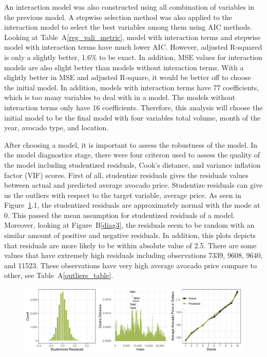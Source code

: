 \documentclass[11pt]{article}\usepackage[]{graphicx}\usepackage[]{color}
\makeatletter
\def\maxwidth{ %
  \ifdim\Gin@nat@width>\linewidth
    \linewidth
  \else
    \Gin@nat@width
  \fi
}
\makeatother
\begin{document}
\noindent An interaction model was also constructed using all combination of variables in the previous model. A stepwise selection method was also applied to the interaction model to select the best variables among them using AIC methods. Looking at Table~A\ref{reg_vali_metric}, model with interaction terms and stepwise model with interaction terms have much lower AIC. However, adjusted R-squared is only a slightly better, 1.6\% to be exact. In addition, MSE values for interaction models are also slight better than models without interaction terms. With a slightly better in MSE and adjusted R-square, it would be better off to choose the initial model. In addition, models with interaction terms have 77 coefficients, which is too many variables to deal with in a model. The models without interaction terms only have  16 coefficients. Therefore, this analysis will choose the initial model to be the final model with four variables total volume, month of the year, avocado type, and location.      
\hfill \break

\noindent After choosing a model, it is important to assess the robustness of the model. In the model diagnostics stage, there were four criteron used to assess the quality of the model including studentized residuals, Cook's distance, and variance inflation factor (VIF) scores. First of all, studentize residuals gives the residuals values between actual and predicted average avocado price. Studentize residuals can give us the outliers with respect to the target variable, average price. As seen in Figure~\ref{diag1}.1, the studentized residuals are approximately normal with the mode at 0. This passed the mean assumption for studentized residuals of a model. Moreover, looking at Figure~B\ref{diag3}, the residuals seem to be random with an similar amount of positive and negative residuals. In addition, this plots depicts that residuals are more likely to be within absolute value of 2.5. There are some values that have extremely high residuals including observations 7339, 9608, 9640, and 11523. These observations have very high average avocado price compare to other, see Table~A\ref{outliers_table}.       







\begin{figure}[h!] 
\begin{center}

\includegraphics[width=\maxwidth]{figure/unnamed-chunk-4-1} 

\caption{}
\label{diag1}
\end{center} 
\end{figure}
\end{document}

